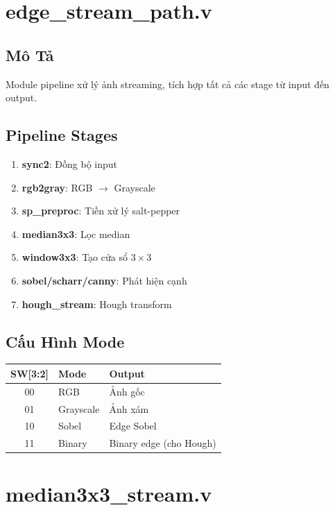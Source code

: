 \documentclass[12pt,a4paper]{article}
\begin{document}
\section{edge\_stream\_path.v}

\subsection{Mô Tả}
Module pipeline xử lý ảnh streaming, tích hợp tất cả các stage từ input đến output.

\subsection{Pipeline Stages}
\begin{enumerate}
    \item \textbf{sync2}: Đồng bộ input
    \item \textbf{rgb2gray}: RGB $\rightarrow$ Grayscale
    \item \textbf{sp\_preproc}: Tiền xử lý salt-pepper
    \item \textbf{median3x3}: Lọc median
    \item \textbf{window3x3}: Tạo cửa sổ $3\times3$
    \item \textbf{sobel/scharr/canny}: Phát hiện cạnh
    \item \textbf{hough\_stream}: Hough transform
\end{enumerate}

\subsection{Cấu Hình Mode}
\begin{table}[h]
\centering
\begin{tabular}{|c|l|l|}
\hline
\textbf{SW[3:2]} & \textbf{Mode} & \textbf{Output} \\
\hline
00 & RGB & Ảnh gốc \\
01 & Grayscale & Ảnh xám \\
10 & Sobel & Edge Sobel \\
11 & Binary & Binary edge (cho Hough) \\
\hline
\end{tabular}
\end{table}

\section{median3x3\_stream.v}
\end{document}
